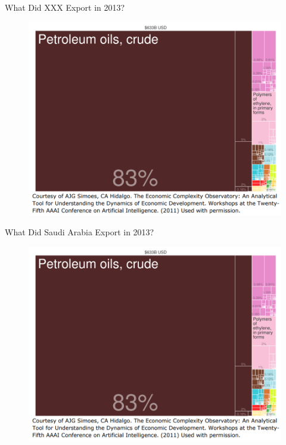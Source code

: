 \documentclass[10pt,hyperref={CJKbookmarks=true},xcolor=dvipsnames,aspectratio=169]{beamer}
\begin{document}
\begin{frame}{What Did XXX Export in 2013?}


\begin{figure}
\includegraphics[scale=0.35]{fig/gravity/com2-4.PNG}
\end{figure}

\end{frame}

\begin{frame}{What Did Saudi Arabia Export in 2013?}


\begin{figure}
\includegraphics[scale=0.35]{fig/gravity/com2-4.PNG}
\end{figure}

\end{frame}
\end{document}
